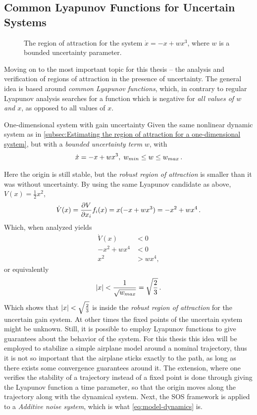 \subsection{Common Lyapunov Functions for Uncertain Systems}

\begin{figure}
  \centering
  
  \caption[The region of attraction for the system \(\dot{x} = -x + wx^3\)]{The
    region of attraction for the system \(\dot{x} = -x + wx^3\), where \(w\) is
    a bounded uncertainty parameter.}
\end{figure}

Moving on to the most important topic for this thesis -- the analysis and
verification of regions of attraction in the presence of uncertainty. The
general idea is based around \textit{common Lyapunov functions}, which, in
contrary to regular Lyapunov analysis searches for a function which is negative
for \textit{all values of \(w\) and \(x\)}, as opposed to all values of \(x\).
\begin{example}{One-dimensional system with gain uncertainty}
  Given the same nonlinear dynamic system as in \cref{subsec:Estimating the
    region of attraction for a one-dimensional system}, but with a
  \textit{bounded uncertainty term} \(w\), with
  \[
    \dot{x} = -x + wx^3, \; w_{min} \leq w \leq w_{max} \, .
  \]
\end{example}
Here the origin is still stable, but the \textit{robust region of attraction} is
smaller than it was without uncertainty. By using the same Lyapunov candidate as
above, \(V(x) = \frac{1}{2}x^2\),
\[
  \dot{V}(x) = \frac{\partial V}{\partial x_i} f_i(x) = x(-x + wx^3) = -x^2 +
  wx^4 \, .
\]
Which, when analyzed yields
\begin{align*}
  \dot{V}(x) &< 0 \\
  -x^2 + wx^4 &< 0 \\
  x^2 &> wx^4,
\end{align*}
or equivalently
\[
  \lvert x\rvert < \frac{1}{\sqrt{w_{max}}} = \sqrt{\frac{2}{3}} \, .
\]
Which shows that \(\lvert x\rvert < \sqrt{\frac{2}{3}}\) is inside the \textit{robust
  region of attraction} for the uncertain gain system. At other times the fixed
points of the uncertain system might be unknown. Still, it is possible to employ
Lyapunov functions to give guarantees about the behavior of the system. For this
thesis this idea will be employed to stabilize a simple airplane model around a
nominal trajectory, thus it is not so important that the airplane sticks exactly
to the path, as long as there exists some convergence guarantees around it. The
extension, where one verifies the stability of a trajectory instead of a fixed
point is done through giving the Lyapunov function a time parameter, so that the
origin moves along the trajectory along with the dynamical system. Next, the
\ac{SOS} framework is applied to a \textit{Additive noise system}, which is what
\cref{eq:model-dynamics} is.

